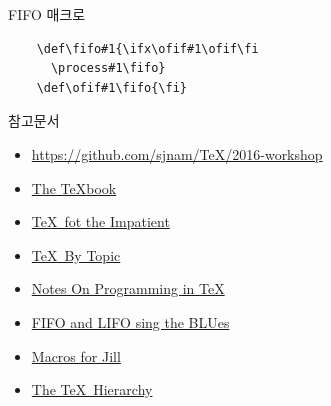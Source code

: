 \documentclass{beamer}
\begin{document}
%
\begin{frame}[fragile]{FIFO 매크로}
  \large
  \begin{verbatim}
    \def\fifo#1{\ifx\ofif#1\ofif\fi
      \process#1\fifo}
    \def\ofif#1\fifo{\fi}
  \end{verbatim}
\end{frame}


%
\begin{frame}{참고문서}
  \begin{itemize}
  \item \url{https://github.com/sjnam/TeX/2016-workshop}
  \item \href{http://ftp.ktug.org/tex-archive/systems/knuth/dist/tex/}
    {The \TeX book}
  \item \href{http://ftp.ktug.org/tex-archive/info/impatient/book.pdf}
    {\TeX\ fot the Impatient}
  \item \href{http://ftp.ktug.org/tex-archive/info/texbytopic/TeXbyTopic.pdf}
    {\TeX\ By Topic}
  \item \href{http://pgfplots.sourceforge.net/TeX-programming-notes.pdf}
    {Notes On Programming in TeX}
  \item \href{https://www.tug.org/TUGboat/tb14-1/tb38laan.pdf}
    {FIFO and LIFO sing the BLUes}
  \item \href{https://www.tug.org/TUGboat/tb08-3/tb19knut.pdf}
    {Macros for Jill}
  \item \href{https://www.tug.org/TUGboat/tb15-1/tb42arseneau.pdf}
    {The TeX\ Hierarchy}
  \end{itemize}
\end{frame}


%
\end{document}
